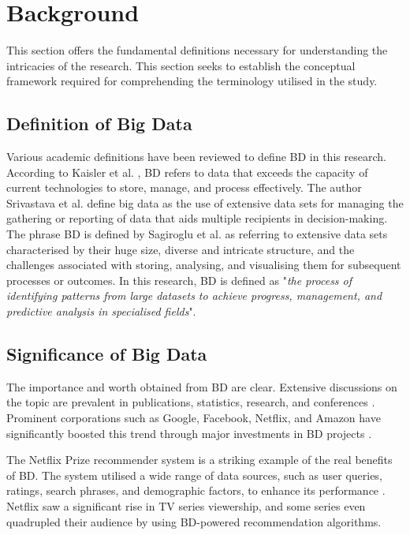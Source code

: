\documentclass[review]{elsarticle}
\begin{document}
\section{Background} \label{sec:background} 

This section offers the fundamental definitions necessary for understanding the intricacies of the research. This section seeks to establish the conceptual framework required for comprehending the terminology utilised in the study. 

\subsection{Definition of Big Data} Various academic definitions have been reviewed to define BD in this research. According to Kaisler et al. \cite{Kaisler2013}, BD refers to data that exceeds the capacity of current technologies to store, manage, and process effectively. The author Srivastava et al. \cite{Srivastava2016} define big data as the use of extensive data sets for managing the gathering or reporting of data that aids multiple recipients in decision-making. The phrase BD is defined by Sagiroglu et al. \cite{Sagiroglu2013} as referring to extensive data sets characterised by their huge size, diverse and intricate structure, and the challenges associated with storing, analysing, and visualising them for subsequent processes or outcomes. In this research, BD is defined as "\emph{the process of identifying patterns from large datasets to achieve progress, management, and predictive analysis in specialised fields}". 

\subsection{Significance of Big Data}\label{sec:The Value of Big Data} 

The importance and worth obtained from BD are clear. Extensive discussions on the topic are prevalent in publications, statistics, research, and conferences \cite{Chen2012,ataei2023towards}. Prominent corporations such as Google, Facebook, Netflix, and Amazon have significantly boosted this trend through major investments in BD projects \cite{AtaeiHype}. 

The Netflix Prize recommender system is a striking example of the real benefits of BD. The system utilised a wide range of data sources, such as user queries, ratings, search phrases, and demographic factors, to enhance its performance \cite{Amatriain2013}. Netflix saw a significant rise in TV series viewership, and some series even quadrupled their audience by using BD-powered recommendation algorithms. 
\end{document}

